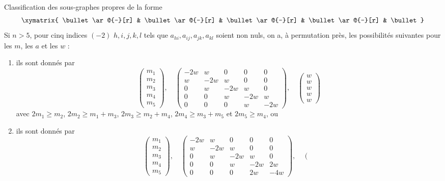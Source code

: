 \begin{lemma}
\label{lemma-five-by-five}
Classification des sous-graphes propres de la forme
$$
\xymatrix{
\bullet \ar@{-}[r] &
\bullet \ar@{-}[r] &
\bullet \ar@{-}[r] &
\bullet \ar@{-}[r] &
\bullet
}
$$
Si $n > 5$, pour cinq indices $(-2)$ $h, i, j, k, l$
tels que $a_{hi}, a_{ij}, a_{jk}, a_{kl}$ soient non nuls, on a,
à permutation près, les possibilités suivantes pour les $m$, les $a$ et les $w$ :
\begin{enumerate}
\item
\label{item-A5}
ils sont donnés par
$$
\left(
\begin{matrix}
m_1 \\
m_2 \\
m_3 \\
m_4 \\
m_5
\end{matrix}
\right),
\quad
\left(
\begin{matrix}
-2w & w & 0 & 0 & 0 \\
w & -2w & w & 0 & 0 \\
0 & w & -2w & w & 0 \\
0 & 0 & w & -2w & w \\
0 & 0 & 0 & w & -2w
\end{matrix}
\right),
\quad
\left(
\begin{matrix}
w \\
w \\
w \\
w \\
w
\end{matrix}
\right)
$$
avec $2m_1 \geq m_2$, $2m_2 \geq m_1 + m_3$, $2m_3 \geq m_2 + m_4$,
$2m_4 \geq m_3 + m_5$ et $2m_5 \geq m_4$, ou
\item
\label{item-C5}
ils sont donnés par
$$
\left(
\begin{matrix}
m_1 \\
m_2 \\
m_3 \\
m_4 \\
m_5
\end{matrix}
\right),
\quad
\left(
\begin{matrix}
-2w & w & 0 & 0 & 0 \\
w & -2w & w & 0 & 0 \\
0 & w & -2w & w & 0 \\
0 & 0 & w & -2w & 2w \\
0 & 0 & 0 & 2w & -4w
\end{matrix}
\right),
\quad
\left(
\begin{matrix}

\end{matrix}$$
\end{enumerate}
\end{lemma}
